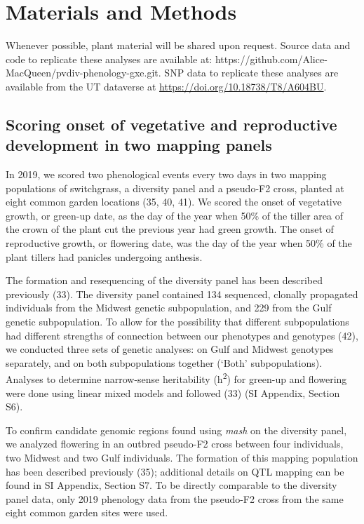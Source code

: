 \documentclass[
  9pt,
  twocolumn,
  twoside]{pnas-new}
\begin{document}
\section{Materials and Methods}\label{materials-and-methods}

Whenever possible, plant material will be shared upon request. Source
data and code to replicate these analyses are available at:
https://github.com/Alice-MacQueen/pvdiv-phenology-gxe.git. SNP data to
replicate these analyses are available from the UT dataverse at
\url{https://doi.org/10.18738/T8/A604BU}.

\subsection{Scoring onset of vegetative and reproductive development in
two mapping
panels}\label{scoring-onset-of-vegetative-and-reproductive-development-in-two-mapping-panels}

In 2019, we scored two phenological events every two days in two mapping
populations of switchgrass, a diversity panel and a pseudo-F2 cross,
planted at eight common garden locations (35, 40, 41). We scored the
onset of vegetative growth, or green-up date, as the day of the year
when 50\% of the tiller area of the crown of the plant cut the previous
year had green growth. The onset of reproductive growth, or flowering
date, was the day of the year when 50\% of the plant tillers had
panicles undergoing anthesis.

The formation and resequencing of the diversity panel has been described
previously (33). The diversity panel contained 134 sequenced, clonally
propagated individuals from the Midwest genetic subpopulation, and 229
from the Gulf genetic subpopulation. To allow for the possibility that
different subpopulations had different strengths of connection between
our phenotypes and genotypes (42), we conducted three sets of genetic
analyses: on Gulf and Midwest genotypes separately, and on both
subpopulations together (`Both' subpopulations). Analyses to determine
narrow-sense heritability (h\textsuperscript{2}) for green-up and
flowering were done using linear mixed models and followed (33) (SI
Appendix, Section S6).

To confirm candidate genomic regions found using \emph{mash} on the
diversity panel, we analyzed flowering in an outbred pseudo-F2 cross
between four individuals, two Midwest and two Gulf individuals. The
formation of this mapping population has been described previously (35);
additional details on QTL mapping can be found in SI Appendix, Section
S7. To be directly comparable to the diversity panel data, only 2019
phenology data from the pseudo-F2 cross from the same eight common
garden sites were used.
\end{document}

